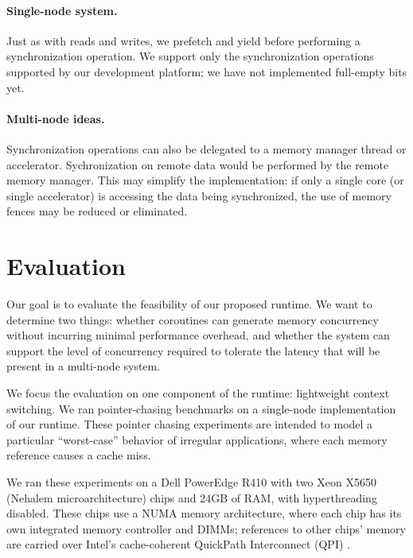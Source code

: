 \documentclass[10pt,nocopyrightspace,preprint]{sigplanconf}
\begin{document}
\paragraph{Single-node system.}
Just as with reads and writes, we prefetch and yield before performing
a synchronization operation. We support only the synchronization
operations supported by our development platform; we have not
implemented full-empty bits yet.

\paragraph{Multi-node ideas.}
Synchronization operations can also be delegated to a memory manager
thread or accelerator. Sychronization on remote data would be
performed by the remote memory manager. This may simplify the
implementation: if only a single core (or single accelerator) is
accessing the data being synchronized, the use of memory fences may be
reduced or eliminated.


\section{Evaluation}
\label{sec:evaluation}

Our goal is to evaluate the feasibility of our proposed runtime. We want to determine two things: whether coroutines can generate memory concurrency without incurring minimal performance overhead, and whether the system can support the level of concurrency required to tolerate the latency that will be present in a multi-node system.

We focus the evaluation on one component of the runtime: lightweight context switching. We ran pointer-chasing benchmarks on a single-node implementation of our runtime. These pointer chasing experiments are intended to model a particular ``worst-case'' behavior of irregular applications, where each memory reference causes a cache miss.

We ran these experiments on a Dell PowerEdge R410 with two Xeon X5650 (Nehalem microarchitecture)
chips and 24GB of RAM, with hyperthreading disabled. These
chips use a NUMA memory architecture, where each chip has
its own integrated memory controller and DIMMs; references to other
chips' memory are carried over Intel's cache-coherent QuickPath
Interconnect (QPI) \cite{quickpath:website}.
\end{document}
